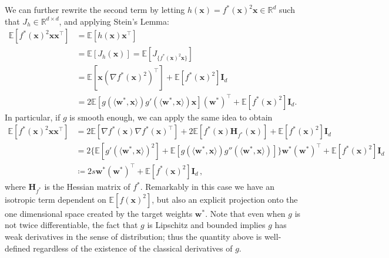 We can further rewrite the second term by letting $h(\boldsymbol{x}) = f^*(\boldsymbol{x})^2\boldsymbol{x} \in \mathbb{R}^d$ such that $J_h \in \mathbb{R}^{d \times d}$, and applying Stein's Lemma:
\begin{align*}
    \mathbb{E}[f^*(\boldsymbol{x})^2\boldsymbol{x}\boldsymbol{x}^\top] &= \mathbb{E}[h(\boldsymbol{x})\boldsymbol{x}^\top] \\
        &= \mathbb{E}[J_h(\boldsymbol{x})] = \mathbb{E}[J_{\{f^*(\boldsymbol{x})^2\boldsymbol{x}\}}] \\
        &= \mathbb{E}[\boldsymbol{x}(\nabla f^*(\boldsymbol{x})^2)^\top] + \mathbb{E}[f^*(\boldsymbol{x})^2]\boldsymbol{I}_d \\
        &= 2\mathbb{E}[g(\langle\boldsymbol{w}^*,\boldsymbol{x}\rangle)g'(\langle\boldsymbol{w}^*,\boldsymbol{x}\rangle)\boldsymbol{x}](\boldsymbol{w}^*)^\top + \mathbb{E}[f^*(\boldsymbol{x})^2]\boldsymbol{I}_d.
\end{align*}
In particular, if $g$ is smooth enough, we can apply the same idea to obtain 
\begin{align*}
    \mathbb E[f^*(\bm x)^2 \bm x\bm x^\top] &= 2\mathbb E[\nabla f^*(\bm x) \nabla f^*(\bm x)^\top] + 2\mathbb E[f^*(\bm x) \bm H_{f^*}(\bm x)] + \mathbb E[f^*(\bm x)^2]\bm I_d\\
    &= 2\{\mathbb E[g'(\langle \bm w^*,\bm x\rangle)^2]+ \mathbb E[g(\langle \bm w^*,\bm x\rangle)g''(\langle \bm w^*,\bm x\rangle)]\}\bm w^*(\bm w^*)^\top + \mathbb E[f^*(\bm x)^2]\bm I_d\\
    &\coloneqq 2 s \bm w^*(\bm w^*)^\top + \mathbb E[f^*(\bm x)^2]\bm I_d\,,
\end{align*}
where $\bm H_{f^*}$ is the Hessian matrix of $f^*$. Remarkably in this case we have an isotropic term dependent on $\mathbb E[f(\bm x)^2]$, but also an explicit projection onto the one dimensional space created by the target weights $\bm w^*$. Note that even when $g$ is not twice differentiable, the fact that $g$ is Lipschitz and bounded implies $g$ has weak derivatives in the sense of distribution; thus the quantity above is well-defined regardless of the existence of the classical derivatives of $g$.

